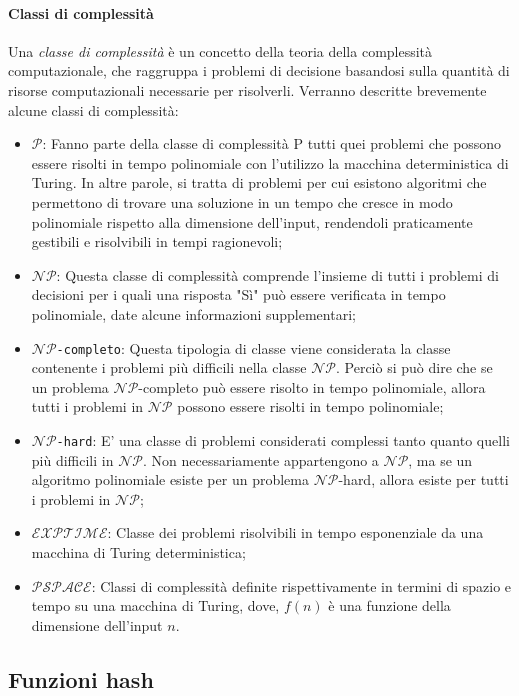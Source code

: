 \documentclass{article}
\theoremstyle{definition}
\begin{document}
\paragraph{Classi di complessità}
Una \emph{classe di complessità} è un concetto della teoria della complessità computazionale, che raggruppa i problemi di decisione basandosi sulla quantità di risorse computazionali necessarie per risolverli.
Verranno descritte brevemente alcune classi di complessità:
\begin{itemize}[label={\textbullet}]
  \item \texttt{$\mathcal{P}$}: Fanno parte della classe di complessità P tutti quei problemi che possono essere risolti in tempo polinomiale con l'utilizzo la macchina deterministica di Turing. In altre parole, si tratta di problemi per cui esistono algoritmi che permettono di trovare una soluzione in un tempo che cresce in modo polinomiale rispetto alla dimensione dell'input, rendendoli praticamente gestibili e risolvibili in tempi ragionevoli;
  \item \texttt{$\mathcal{NP}$}: Questa classe di complessità comprende l'insieme di tutti i problemi di decisioni per i quali una risposta "Sì" può essere verificata in tempo polinomiale, date alcune informazioni supplementari;
  \item \texttt{$\mathcal{NP}$-completo}: Questa tipologia di classe viene considerata la classe contenente i problemi più difficili nella classe {$\mathcal{NP}$}. Perciò si può dire che se un problema {$\mathcal{NP}$-completo} può essere risolto in tempo polinomiale, allora tutti i problemi in {$\mathcal{NP}$} possono essere risolti in tempo polinomiale;
  \item \texttt{$\mathcal{NP}$-hard}: E' una classe di problemi considerati complessi tanto quanto quelli più difficili in {$\mathcal{NP}$}. Non necessariamente appartengono a {$\mathcal{NP}$}, ma se un algoritmo polinomiale esiste per un problema {$\mathcal{NP}$-hard}, allora esiste per tutti i problemi in {$\mathcal{NP}$};
  \item \texttt{$\mathcal{EXPTIME}$}: Classe dei problemi risolvibili in tempo esponenziale da una macchina di Turing deterministica;
  \item \texttt{$\mathcal{PSPACE}$}: Classi di complessità definite rispettivamente in termini di spazio e tempo su una macchina di Turing, dove, $f(n)$ è una funzione della dimensione dell'input $n$.
\end{itemize}

\subsection{Funzioni hash}
\end{document}
